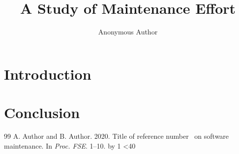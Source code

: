\documentclass[acmsmall,screen,review,anonymous]{acmart}
\begin{document}
\title{A Study of Maintenance Effort}
\author{Anonymous Author}
\begin{abstract}
\lipsum[1]
\end{abstract}
\maketitle
\section{Introduction}
\lipsum[2-20]
\section{Conclusion}
\lipsum[21-30]
\begin{thebibliography}{99}
\newcount\n {}
\loop {} A. Author and B. Author. 2020. Title of reference number \the\n\ on software maintenance. In \emph{Proc. FSE}. 1--10.
\advance\n by 1 \ifnum\n<40 \repeat
\end{thebibliography}
\end{document}
